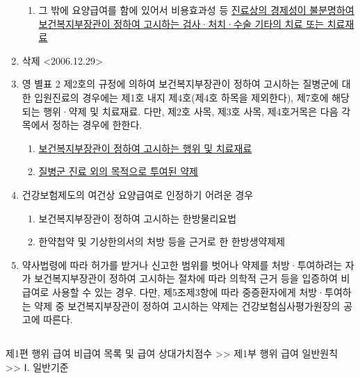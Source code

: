 \begin{enumerate}[1.]
\begin{enumerate}[가.]
	\item 그 밖에 요양급여를 함에 있어서 비용효과성 등 \uline{진료상의 경제성이 불분명하여 보건복지부장관이 정하여 고시하는 검사·처치·수술 기타의 치료 또는 치료재료}
	\end{enumerate}
\item 삭제 <2006.12.29>
\item 영 별표 2 제2호의 규정에 의하여 보건복지부장관이 정하여 고시하는 질병군에 대한 입원진료의 경우에는 제1호 내지 제4호(제4호 하목을 제외한다), 제7호에 해당되는 행위·약제 및 치료재료. 다만, 제2호 사목, 제3호 사목, 제4호거목은 다음 각목에서 정하는 경우에 한한다.
	\begin{enumerate}[가.]\tightlist
	\item \uline{보건복지부장관이 정하여 고시하는 행위 및 치료재료}
  	\item \uline{질병군 진료 외의 목적으로 투여된 약제}
	\end{enumerate}
\item 건강보험제도의 여건상 요양급여로 인정하기 어려운 경우
	\begin{enumerate}[가.]\tightlist
	\item 보건복지부장관이 정하여 고시하는 한방물리요법
  	\item 한약첩약 및 기상한의서의 처방 등을 근거로 한 한방생약제제
	\end{enumerate}
\item 약사법령에 따라 허가를 받거나 신고한 범위를 벗어나 약제를 처방·투여하려는 자가 보건복지부장관이 정하여 고시하는 절차에 따라 의학적 근거 등을 입증하여 비급여로 사용할 수 있는 경우. 다만, 제5조제3항에 따라 중증환자에게 처방·투여하는 약제 중 보건복지부장관이 정하여 고시하는 약제는 건강보험심사평가원장의 공고에 따른다.
\end{enumerate}

\subsection{}
\begin{mdframed}[linecolor=blue,middlelinewidth=2]
제1편 행위 급여 \cntrdot{}  비급여 목록 및 급여 상대가치점수 >> 제1부 행위 급여 일반원칙 >> Ⅰ. 일반기준
\end{mdframed}

